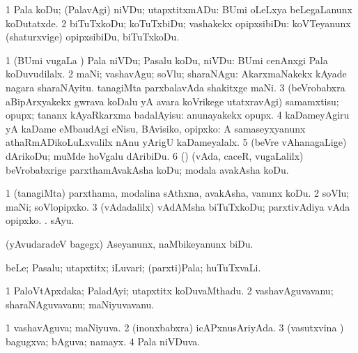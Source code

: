 \bentry
{} 
\gl{\sakirx} 
\bmng
\bnum
\num{1} Pala koDu; (PalavAgi) niVDu; utapxtitxmADu:  BUmi oLeLxya beLegaLanunx koDutatxde. 
\num{2} biTuTxkoDu; koTuTxbiDu; vashakekx opipxsibiDu:  koVTeyanunx (shaturxvige) opipxsibiDu, biTuTxkoDu.
\enum
\emng  

\noindent                   
\gl{\akirx} 
\bmng
\bnum
\num{1} (BUmi \mo vugaLa \vi) Pala niVDu; Pasalu koDu, niVDu:  BUmi cenAnxgi Pala koDuvudilalx. 
\num{2} maNi; vashavAgu; soVlu; sharaNAgu:  AkarxmaNakekx kAyade nagara sharaNAyitu.  tanagiMta parxbalavAda shakitxge maNi. 
\num{3} (beVrobabxra aBipArxyakekx gwrava koDalu yA avara koVrikege utatxravAgi) samamxtisu; opupx; tananx kAyaRkarxma badalAyisu:  anunayakekx opupx. 
\num{4} kaDameyAgiru yA kaDame eMbaudAgi eNisu, BAvisiko, opipxko:  A samaseyxyanunx athaRmADikoLuLxvalilx nAnu yArigU kaDameyalalx. 
\num{5} (beVre vAhanagaLige) dArikoDu; muMde hoVgalu dAribiDu. 
\num{6} (\ame) (vAda, caceR, \mo vugaLalilx) beVrobabxrige parxthamAvakAsha koDu; modala avakAsha koDu.
\enum
\emng

\noindent
\gl{\pagu} 
\bmng
\bnum
\num{1}  (tanagiMta) parxthama, modalina sAthxna, avakAsha, \mo vanunx koDu. 
\num{2}   soVlu; maNi; soVlopipxko. 
\num{3}   (vAdadalilx) vAdAMsha biTuTxkoDu; parxtivAdiya vAda opipxko. 
  . 
\banum
{} sAyu.

 (yAvudaradeV bagegx) Aseyanunx, naMbikeyanunx biDu.
\eanum
\numie
\enum
\emng
\eentry

\bentry
{} 
\gl{\nA} 
\bmng
beLe; Pasalu; utapxtitx; iLuvari; (parxti)Pala; huTuTxvaLi.
\emng
\eentry

\bentry
{} 
\gl{\nA} 
\bmng
\bnum
\num{1} PaloVtApxdaka; PaladAyi; utapxtitx koDuvaMthadu. 
\num{2} vashavAguvavanu; sharaNAguvavanu; maNiyuvavanu.
\enum
\emng
\eentry

\bentry
{} 
\gl{\gu} 
\bmng
\bnum
\num{1} vashavAguva; maNiyuva. 
\num{2} (inonxbabxra) icAPxnusAriyAda. 
\num{3} (vasutxvina \vi) bagugxva; bAguva; namayx. 
\num{4} Pala niVDuva.
\enum
\emng
\eentry

